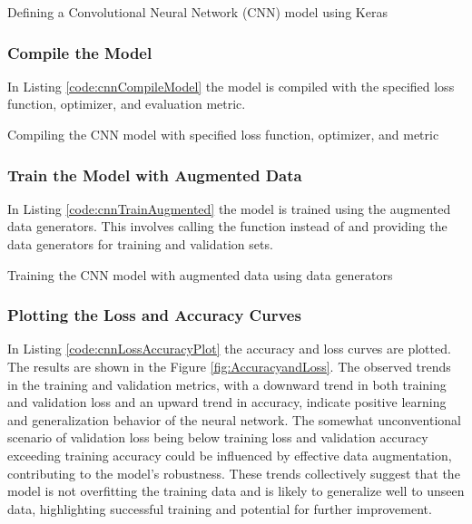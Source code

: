 \begin{code}[h!]
	    
	
	\caption{Defining a Convolutional Neural Network (CNN) model using Keras}
	\label{code:cnnDefinition}
\end{code}

\subsubsection{Compile the Model}

In Listing \ref{code:cnnCompileModel} the model is compiled with the specified loss function, optimizer, and evaluation metric.

\begin{code}[h!]
	    
	
	\caption{Compiling the CNN model with specified loss function, optimizer, and metric}
	\label{code:cnnCompileModel}
\end{code}

\subsubsection{Train the Model with Augmented Data}

In Listing \ref{code:cnnTrainAugmented} the model is trained using the augmented data generators. This involves calling the  function instead of  and providing the data generators for training and validation sets.

\begin{code}[h!]
	    
	
	\caption{Training the CNN model with augmented data using data generators}
	\label{code:cnnTrainAugmented}
\end{code}

\subsubsection{Plotting the Loss and Accuracy Curves}

In Listing \ref{code:cnnLossAccuracyPlot} the accuracy and loss curves are plotted. The results are shown in the Figure \ref{fig:AccuracyandLoss}. The observed trends in the training and validation metrics, with a downward trend in both training and validation loss and an upward trend in accuracy, indicate positive learning and generalization behavior of the neural network. The somewhat unconventional scenario of validation loss being below training loss and validation accuracy exceeding training accuracy could be influenced by effective data augmentation, contributing to the model's robustness. These trends collectively suggest that the model is not overfitting the training data and is likely to generalize well to unseen data, highlighting successful training and potential for further improvement.

